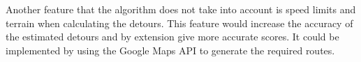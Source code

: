 Another feature that the algorithm does not take into account is speed limits and terrain when calculating the detours.
This feature would increase the accuracy of the estimated detours and by extension give more accurate scores.
It could be implemented by using the Google Maps API to generate the required routes.

